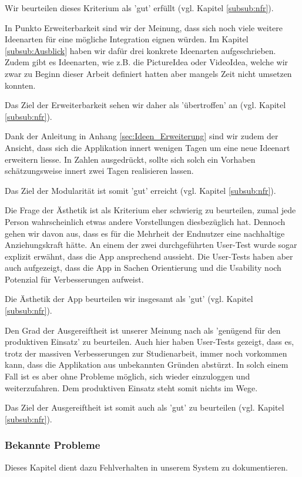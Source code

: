 Wir beurteilen dieses Kriterium als 'gut' erfüllt (vgl. Kapitel \ref{subsub:nfr}).
 
 In Punkto Erweiterbarkeit sind wir der Meinung, dass sich  noch viele weitere Ideenarten für eine mögliche Integration eignen würden. Im Kapitel \ref{subsub:Ausblick} haben wir dafür drei konkrete Ideenarten aufgeschrieben. Zudem gibt es Ideenarten, wie z.B. die PictureIdea oder VideoIdea, welche wir zwar zu Beginn dieser Arbeit definiert hatten aber mangels Zeit nicht umsetzen konnten. 
 
Das Ziel der Erweiterbarkeit sehen wir daher als 'übertroffen' an (vgl. Kapitel \ref{subsub:nfr}).

Dank der Anleitung in Anhang \ref{sec:Ideen_Erweiterung} sind wir zudem der Ansicht, dass sich die Applikation innert wenigen Tagen um eine neue Ideenart erweitern liesse. In Zahlen ausgedrückt, sollte sich solch ein Vorhaben schätzungsweise innert zwei Tagen realisieren lassen. 

Das Ziel der Modularität ist somit 'gut' erreicht (vgl. Kapitel \ref{subsub:nfr}).

Die Frage der Ästhetik ist als Kriterium eher schwierig zu beurteilen, zumal jede Person wahrscheinlich etwas andere Vorstellungen diesbezüglich hat. Dennoch gehen wir davon aus, dass es für die Mehrheit der Endnutzer eine nachhaltige Anziehungskraft hätte. An einem der zwei durchgeführten User-Test wurde sogar explizit erwähnt, dass die App ansprechend aussieht. Die User-Tests haben aber auch aufgezeigt, dass die App in Sachen Orientierung und die Usability noch Potenzial für Verbesserungen aufweist.

Die Ästhetik der App beurteilen wir insgesamt als 'gut' (vgl. Kapitel \ref{subsub:nfr}).

Den Grad der Ausgereiftheit ist unserer Meinung nach als 'genügend für den produktiven Einsatz' zu beurteilen. Auch hier haben User-Tests gezeigt, dass es, trotz der massiven Verbesserungen zur Studienarbeit, immer noch vorkommen kann, dass die Applikation aus unbekannten Gründen abstürzt. In solch einem Fall ist es aber ohne Probleme möglich, sich wieder einzuloggen und weiterzufahren. Dem produktiven Einsatz steht somit nichts im Wege.

Das Ziel der Ausgereiftheit ist somit auch als 'gut' zu beurteilen (vgl. Kapitel \ref{subsub:nfr}). 

\subsubsection{Bekannte Probleme}
Dieses Kapitel dient dazu Fehlverhalten in unserem System zu dokumentieren.

